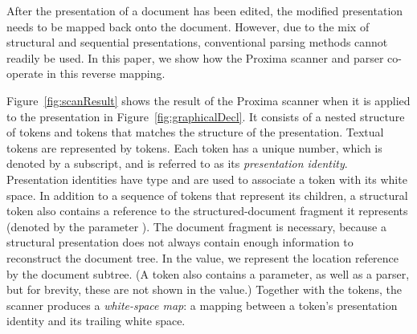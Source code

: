 \documentclass{article}[10pt]
\begin{document}
After the presentation of a document has been edited, the modified presentation needs to be mapped back onto the document. However, due to the mix of structural and sequential presentations, conventional parsing methods cannot readily be used. In this paper, we show how the Proxima scanner and parser co-operate in this reverse mapping. 

Figure~\ref{fig:scanResult} shows the result of the Proxima scanner when it is applied to the presentation in Figure~\ref{fig:graphicalDecl}. It consists of a nested structure of  tokens and  tokens that matches the structure of the presentation. Textual tokens are represented by  tokens. Each token has a unique number, which is denoted by a subscript, and is referred to as its {\em presentation identity}. Presentation identities have type  and are used to associate a token with its white space. In addition to a sequence of tokens that represent its children, a structural token also contains a reference to the structured-document fragment it represents (denoted by the parameter ). The document fragment is necessary, because a structural presentation does not always contain enough information to reconstruct the document tree. In the  value, we represent the location reference by the document subtree. (A  token also contains a  parameter, as well as a parser, but for brevity, these are not shown in the value.) Together with the tokens, the scanner produces a {\em white-space map}: a mapping between a token's presentation identity and its trailing white space.
\end{document}
